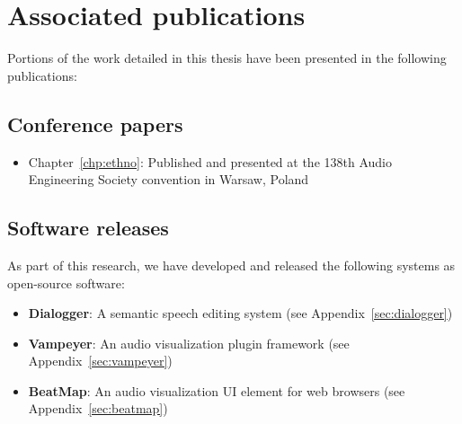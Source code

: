 \section{Associated publications}\label{sec:intro-publications}

Portions of the work detailed in this thesis have been presented in the following publications:

\subsection*{Conference papers}

\begin{itemize}
  \item Chapter~\ref{chp:ethno}: Published and presented at the 138th Audio Engineering Society convention in Warsaw,
    Poland \citep{Baume2015}
\end{itemize}

\subsection*{Software releases}
As part of this research, we have developed and released the following systems as open-source software:

\begin{itemize}
  \item \textbf{Dialogger}: A semantic speech editing system (see Appendix~\ref{sec:dialogger})
  \item \textbf{Vampeyer}: An audio visualization plugin framework (see Appendix~\ref{sec:vampeyer})
  \item \textbf{BeatMap}: An audio visualization UI element for web browsers (see Appendix~\ref{sec:beatmap})
\end{itemize}

